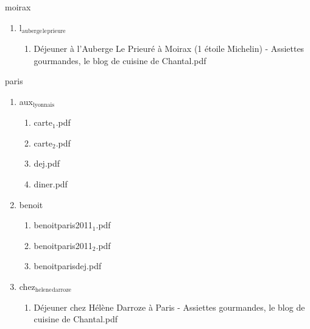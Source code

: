 \documentclass[11pt]{article}
\begin{document}
\item moirax
\label{sec-1-1-1-1-21-10-3-5}
\begin{enumerate}
\item l$_{\text{auberge}}$$_{\text{le}}$$_{\text{prieure}}$
\label{sec-1-1-1-1-21-10-3-5-1}
\begin{enumerate}
\item Déjeuner à l'Auberge Le Prieuré à Moirax (1 étoile Michelin) - Assiettes gourmandes, le blog de cuisine de Chantal.pdf
\label{sec-1-1-1-1-21-10-3-5-1-1}
\end{enumerate}
\end{enumerate}

\item paris
\label{sec-1-1-1-1-21-10-3-6}
\begin{enumerate}
\item aux$_{\text{lyonnais}}$
\label{sec-1-1-1-1-21-10-3-6-1}
\begin{enumerate}
\item carte$_{\text{1}}$.pdf
\label{sec-1-1-1-1-21-10-3-6-1-1}

\item carte$_{\text{2}}$.pdf
\label{sec-1-1-1-1-21-10-3-6-1-2}

\item dej.pdf
\label{sec-1-1-1-1-21-10-3-6-1-3}

\item diner.pdf
\label{sec-1-1-1-1-21-10-3-6-1-4}
\end{enumerate}

\item benoit
\label{sec-1-1-1-1-21-10-3-6-2}
\begin{enumerate}
\item benoitparis2011$_{\text{1}}$.pdf
\label{sec-1-1-1-1-21-10-3-6-2-1}

\item benoitparis2011$_{\text{2}}$.pdf
\label{sec-1-1-1-1-21-10-3-6-2-2}

\item benoitparisdej.pdf
\label{sec-1-1-1-1-21-10-3-6-2-3}
\end{enumerate}

\item chez$_{\text{helene}}$$_{\text{darroze}}$
\label{sec-1-1-1-1-21-10-3-6-3}
\begin{enumerate}
\item Déjeuner chez Hélène Darroze à Paris - Assiettes gourmandes, le blog de cuisine de Chantal.pdf
\label{sec-1-1-1-1-21-10-3-6-3-1}
\end{enumerate}


\end{enumerate}
\end{document}
